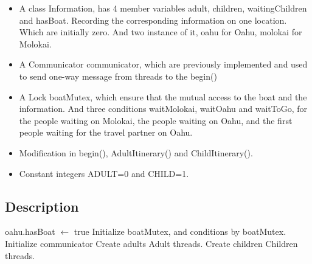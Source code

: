 \documentclass{article}
\begin{document}
	\begin{itemize}
		\item A class Information, has 4 member variables adult, children, waitingChildren and hasBoat. Recording the corresponding information on one location. Which are initially zero. And two instance of it, oahu for Oahu, molokai for Molokai. 
		
		\item A Communicator communicator, which are previously implemented and used to send one-way message from threads to the begin()
		
		\item A Lock boatMutex, which ensure that the mutual access to the boat and the information. And three conditions waitMolokai, waitOahu and waitToGo, for the people waiting on Molokai, the people waiting on Oahu, and the first people waiting for the travel partner on Oahu.
		
		\item Modification in begin(), AdultItinerary() and ChildItinerary().
		
		\item Constant integers ADULT=0 and CHILD=1.
	\end{itemize}
	
	\subsection{Description}
	
	\begin{algorithm}[H]
		\begin{algorithmic}
			\State oahu.hasBoat $\leftarrow$ true
			\State Initialize boatMutex, and conditions by boatMutex.
			\State Initialize communicator
			\State Create adults Adult threads.
			\State Create children Children threads.
			\EndWhile
			\EndProcedure
		\end{algorithmic}
	\end{algorithm}
	
\end{document}
